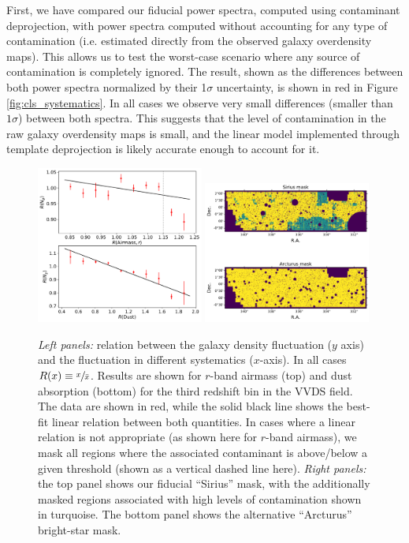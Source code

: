 \documentclass[a4paper,11pt]{article}
\begin{document}
      First, we have compared our fiducial power spectra, computed using contaminant deprojection, with power spectra computed without accounting for any type of contamination (i.e. estimated directly from the observed galaxy overdensity maps). This allows us to test the worst-case scenario where any source of contamination is completely ignored. The result, shown as the differences between both power spectra normalized by their 1$\sigma$ uncertainty, is shown in red in Figure \ref{fig:cls_systematics}. In all cases we observe very small differences (smaller than $1\sigma$) between both spectra. This suggests that the level of contamination in the raw galaxy overdensity maps is small, and the linear model implemented through template deprojection is likely accurate enough to account for it.
      \begin{figure}
        \centering
        \includegraphics[width=0.49\textwidth]{figures/ndens_syst.pdf}
        \includegraphics[width=0.49\textwidth]{figures/systmask.pdf}
        \caption{{\sl Left panels:} relation between the galaxy density fluctuation ($y$ axis) and the fluctuation in different systematics ($x$-axis). In all cases $R(x)\equiv \sfrac{x}{\bar{x}}$. Results are shown for $r$-band airmass (top) and dust absorption (bottom) for the third redshift bin in the VVDS field. The data are shown in red, while the solid black line shows the best-fit linear relation between both quantities. In cases where a linear relation is not appropriate (as shown here for $r$-band airmass), we mask all regions where the associated contaminant is above/below a given threshold (shown as a vertical dashed line here). {\sl Right panels:} the top panel shows our fiducial ``Sirius'' mask, with the additionally masked regions associated with high levels of contamination shown in turquoise. The bottom panel shows the alternative ``Arcturus'' bright-star mask.}
        \label{fig:ndens_syst}
      \end{figure}
      
\end{document}

